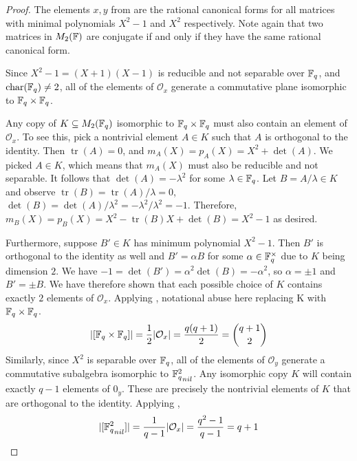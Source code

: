 \documentclass{amsart}
\begin{document}
\begin{proof}
    The elements $x, y$ from  are the rational canonical forms for all matrices with minimal polynomials $X^2 - 1$ and $X^2$ respectively. Note again that two matrices in $M_2(\protect\mathbb{F})$ are conjugate if and only if they have the same rational canonical form.

    Since $X^2 - 1 = (X + 1)(X - 1)$ is reducible and not separable over $\protect\mathbb{F}_q$, and $\operatorname{char}(\protect\mathbb{F}_q) \neq 2$, all of the elements of $\mathcal{O}_x$ generate a commutative plane isomorphic to $\protect\mathbb{F}_q \times \protect\mathbb{F}_q$.

    Any copy of $K \subseteq M_2(\protect\mathbb{F}_q)$ isomorphic to $\protect\mathbb{F}_q \times \protect\mathbb{F}_q$ must also contain an element of $\mathcal{O}_x$. To see this, pick a nontrivial element $A \in K$ such that $A$ is orthogonal to the identity. Then $\operatorname{tr}(A) = 0$, and $m_A(X) = p_A(X) = X^2 + \det(A)$. We picked $A \in K$, which means that $m_A(X)$ must also be reducible and not separable. It follows that $\det(A) = -\lambda^2$ for some $\lambda \in \protect\mathbb{F}_q$. Let $B = A/\lambda \in K$ and observe $\operatorname{tr}(B) = \operatorname{tr}(A)/\lambda = 0$, $\det(B) = \det(A)/\lambda^2 = -\lambda^2/\lambda^2 = -1$. Therefore, $m_B(X) = p_B(X) = X^2 -\operatorname{tr}(B) X + \det(B) = X^2 -1$ as desired.

    Furthermore, suppose $B' \in K$ has minimum polynomial $X^2 - 1$. Then $B'$ is orthogonal to the identity as well and $B' = \alpha B$ for some $\alpha \in \protect\mathbb{F}_q^{\times}$ due to $K$ being dimension $2$. We have $-1 = \det(B') = \alpha^2 \det(B) = -\alpha^2$, so $\alpha = \pm 1$ and $B' = \pm B$. We have therefore shown that each possible choice of $K$ contains exactly $2$ elements of $\mathcal{O}_x$. Applying ,
    {\color{blue} notational abuse here replacing K with $\protect\mathbb{F}_q \times \protect\mathbb{F}_q$}. 
    \begin{align*}
        |[\protect\mathbb{F}_q \times \protect\mathbb{F}_q]| = \frac{1}{2}|\mathcal{O}_x|
                  = \frac{q(q+1)}{2}
                  = \binom{q + 1}{2}
    \end{align*}
    Similarly, since $X^2$ is separable over $\protect\mathbb{F}_q$, all of the elements of $\mathcal{O}_y$ generate a commutative subalgebra isomorphic to ${\protect\mathbb{F}_q^2}_{nil}$. Any isomorphic copy $K$ will contain exactly $q - 1$ elements of $\mathcal{0}_y$. These are precisely the nontrivial elements of $K$ that are orthogonal to the identity. Applying ,
    \begin{align*}
        |[{\protect\mathbb{F}_q^2}_{nil}]| = \frac{1}{q-1}|\mathcal{O}_x|
                            = \frac{q^2-1}{q-1}
                            = q+1
    \end{align*}


\end{proof}
\end{document}
